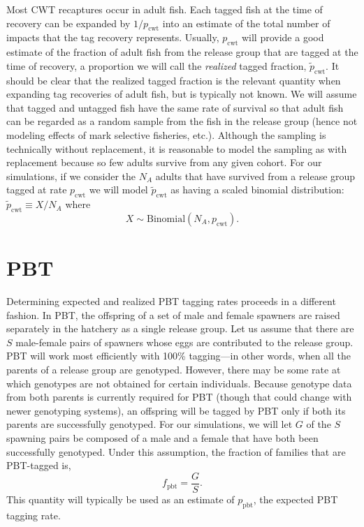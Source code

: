 \documentclass[11pt]{article}
\begin{document}
Most CWT recaptures occur in adult fish.  Each tagged fish at the time of recovery can be
expanded by $1/p_\mathrm{cwt}$ into an estimate of the total number of impacts that the tag recovery represents.
Usually, $p_\mathrm{cwt}$ will provide a good estimate of the fraction of adult fish from the release group
that are tagged at the time of recovery, a proportion we will call the {\em realized} tagged
fraction, $\tilde{p}_\mathrm{cwt}$.  It should be clear that the realized
tagged fraction is the relevant quantity when expanding
tag recoveries of adult fish, but is typically not known.  
We will assume that tagged and untagged fish have the same rate of
survival so that adult fish can be regarded as a random sample from the fish in the release group (hence not modeling
effects of mark selective fisheries, etc.).
Although the sampling is technically without replacement, it is reasonable to model the sampling as
with replacement because so few adults survive from any given cohort.  For our simulations, if we consider the
$N_A$ adults that have survived from a release group tagged at rate $p_\mathrm{cwt}$  we will
model $\tilde{p}_\mathrm{cwt}$ as having a scaled binomial distribution:
$	\tilde{p}_\mathrm{cwt} \equiv X/N_A$ where 
\[
X \sim \mathrm{Binomial}(N_A, p_\mathrm{cwt}).
\]


\section{PBT}
Determining expected and realized PBT tagging rates proceeds in a different fashion.  In PBT, the
offspring of a set of male and female spawners are raised separately in the hatchery
as a single release group. Let us assume that there are $S$ male-female pairs of spawners
whose eggs are contributed to the release group.  PBT will work most
efficiently with 100\% tagging---in other words, when all the parents of a release group
are genotyped.  However, there may be some rate at which genotypes are not obtained for certain
individuals.  Because
genotype data from both parents is currently required for PBT (though that could change with newer genotyping
systems), an offspring will be tagged by PBT only if both its parents are successfully genotyped. For our 
simulations, we will let $G$ of the $S$ spawning pairs be composed of a male
and a female that have both been successfully genotyped. 
Under this assumption, the
fraction of families that are PBT-tagged is,
\[
f_\mathrm{pbt} = \frac{G}{S}.
\]   
This quantity will typically be used as an estimate of $p_\mathrm{pbt}$, the expected PBT tagging rate.
\end{document}
